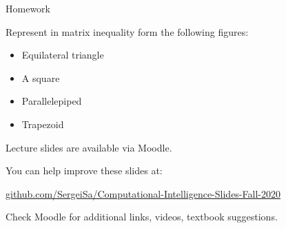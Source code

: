\documentclass{beamer}
\begin{document}
\begin{frame}{Homework}
\begin{flushleft}

Represent in matrix inequality form the following figures:

\begin{itemize}
    \item Equilateral triangle
    \item A square
    \item Parallelepiped
    \item Trapezoid
\end{itemize}

\end{flushleft}
\end{frame}







\begin{frame}
\centerline{Lecture slides are available via Moodle.}
\bigskip
\centerline{You can help improve these slides at:}

\centerline{\href{https://github.com/SergeiSa/Computational-Intelligence-Slides-Fall-2020}{github.com/SergeiSa/Computational-Intelligence-Slides-Fall-2020}}


\bigskip
\centerline{Check Moodle for additional links, videos, textbook suggestions.}
\end{frame}
\end{document}
